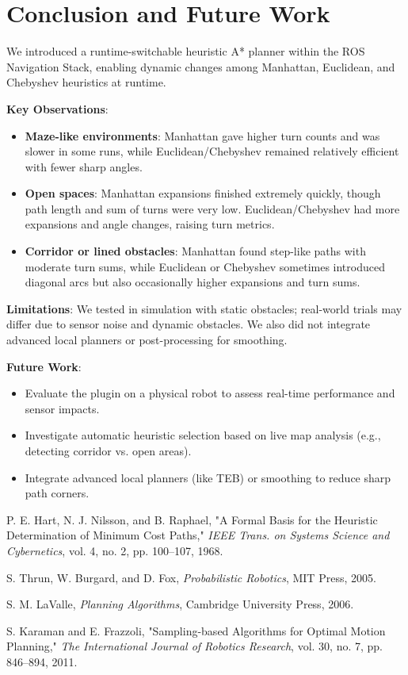 \documentclass[letterpaper, 10 pt, conference]{ieeeconf}
\begin{document}
\section{Conclusion and Future Work}\label{sec:conclusion}
We introduced a runtime-switchable heuristic A* planner within the ROS Navigation Stack, enabling dynamic changes among Manhattan, Euclidean, and Chebyshev heuristics at runtime. 

\textbf{Key Observations}:
\begin{itemize}
    \item \textbf{Maze-like environments}: Manhattan gave higher turn counts and was slower in some runs, while Euclidean/Chebyshev remained relatively efficient with fewer sharp angles.
    \item \textbf{Open spaces}: Manhattan expansions finished extremely quickly, though path length and sum of turns were very low. Euclidean/Chebyshev had more expansions and angle changes, raising turn metrics.
    \item \textbf{Corridor or lined obstacles}: Manhattan found step-like paths with moderate turn sums, while Euclidean or Chebyshev sometimes introduced diagonal arcs but also occasionally higher expansions and turn sums.
\end{itemize}

\textbf{Limitations}: We tested in simulation with static obstacles; real-world trials may differ due to sensor noise and dynamic obstacles. We also did not integrate advanced local planners or post-processing for smoothing.  

\textbf{Future Work}: 
\begin{itemize}
    \item Evaluate the plugin on a physical robot to assess real-time performance and sensor impacts.
    \item Investigate automatic heuristic selection based on live map analysis (e.g., detecting corridor vs. open areas).
    \item Integrate advanced local planners (like TEB) or smoothing to reduce sharp path corners.
\end{itemize}


% 

\begin{thebibliography}{1}

 P. E. Hart, N. J. Nilsson, and B. Raphael, "A Formal Basis for the Heuristic Determination of Minimum Cost Paths," \textit{IEEE Trans. on Systems Science and Cybernetics}, vol. 4, no. 2, pp. 100--107, 1968.

 S. Thrun, W. Burgard, and D. Fox, \textit{Probabilistic Robotics}, MIT Press, 2005.

 S. M. LaValle, \textit{Planning Algorithms}, Cambridge University Press, 2006.

 S. Karaman and E. Frazzoli, "Sampling-based Algorithms for Optimal Motion Planning," \textit{The International Journal of Robotics Research}, vol. 30, no. 7, pp. 846--894, 2011.

\end{thebibliography}
\end{document}
